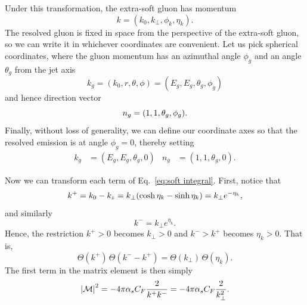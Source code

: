 \documentclass[11pt,twoside,reqno]{amsart}
\theoremstyle{plain}
\theoremstyle{remark}
\theoremstyle{definition}
\theoremstyle{remark}
\theoremstyle{definition}
\theoremstyle{definition}
\newcommand{\cM}{\mathcal{M}}
\begin{document}
	Under this transformation, the extra-soft gluon has momentum
	\begin{equation}
		k = (k_0, k_\perp, \phi_k, \eta_k).
	\end{equation}
	The resolved gluon is fixed in space from the perspective of the extra-soft gluon, so we can write it in whichever coordinates are convenient. Let us pick spherical coordinates, where the gluon momentum has an azimuthal angle $\phi_g$ and an angle $\theta_g$ from the jet axis
	\begin{equation}
		k_g = (k_0, r, \theta, \phi) = (E_g, E_g, \theta_g, \phi_g)
	\end{equation}
	and hence direction vector
	\begin{equation}
		n_g = \qty(1, 1, \theta_g, \phi_g).
	\end{equation}
	Finally, without loss of generality, we can define our coordinate axes so that the resolved emission is at angle $\phi_g = 0$, thereby setting
	\begin{equation}
	\begin{aligned}
		k_g &= (E_g, E_g, \theta_g, 0) & n_g &= (1, 1, \theta_g, 0).
	\end{aligned}
	\end{equation}

	Now we can transform each term of Eq.~\ref{eq:soft integral}. First, notice that
	\begin{equation}\label{eq:kplus coordinates}
		k^+ = k_0 - k_z = k_\perp \qty(\cosh\eta_k - \sinh\eta_k) = k_\perp e^{-\eta_k},
	\end{equation}
	and similarly
	\begin{equation}
		k^- = k_\perp e^{\eta_k}.
	\end{equation}
	Hence, the restriction $k^+ > 0$ becomes $k_\perp > 0$ and $k^- > k^+$ becomes $\eta_k > 0$. That is,
	\begin{equation}
		\Theta(k^+)\,\Theta(k^- - k^+) = \Theta(k_\perp)\,\Theta(\eta_k).
	\end{equation}
	The first term in the matrix element is then simply
	\begin{equation}
		\abs{\cM}^2 = -4\pi\alpha_sC_F\frac{2}{k^+ k^-} = -4\pi\alpha_sC_F\frac{2}{k_\perp^2}.
	\end{equation}
\end{document}
